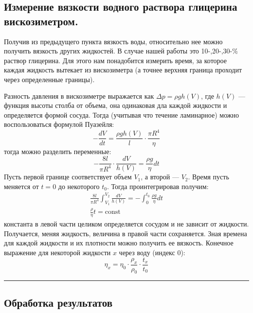 \documentclass[a4paper,12pt]{report}
\newcommand{\const}{\text{const}}
\begin{document}
    \begin{multicols}{2}
        \subsection*{Измерение вязкости водного раствора глицерина вискозиметром.}
        Получив из предыдущего пункта вязкость воды, относительно нее можно получить вязкость других жидкостей. В случае нашей работы это 10-,20-,30-\% раствор глицерина. Для этого нам понадобится измерить время, за которое каждая жидкость вытекает из вискозиметра (а точнее верхняя граница проходит через определенные границы).

        Разность давления в вискозиметре выражается как $\Delta p = \rho g h(V)$, где $h(V)$ --- функция высоты столба от объема, она одинаковая дла каждой жидкости и определяется формой сосуда. Тогда (учитывая что течение ламинарное) можно воспользоваться формулой Пуазейля:
        \begin{equation*}
            -\frac{dV}{dt}=\frac{\rho g h(V)}{l}\cdot\frac{\pi R^4}{\eta}
        \end{equation*}
        тогда можно разделить переменные:
        \begin{equation*}
            -\frac{8 l}{\pi R^4}\cdot \frac{dV}{h(V)}=\frac{\rho g}{\eta}dt
        \end{equation*}
        Пусть первой границе соответствует объем $V_1$, а второй --- $V_2$. Время пусть меняется от $t=0$ до некоторого $t_0$. Тогда проинтегрировав получим:
        \begin{gather}
            \frac{8l}{\pi R^4}\int_{V_1}^{V_2}\frac{dV}{h(V)}=-\int_{0}^{t_0}\frac{\rho g}{\eta}dt \nonumber \\
            \frac{\rho}{\eta}t = \const \label{connst}
        \end{gather}
        константа в левой части целиком определяется сосудом и не зависит от жидкости. Получается, меняя жидкость, величина в правой части сохраняется. Зная времена для каждой жидкости и их плотности можно получить ее вязкость. Конечное выражение для некоторой жидкости $x$ через воду (индекс 0):
        \begin{equation}
            \label{final eta}
            \eta_x=\eta_0\cdot\frac{\rho_x}{\rho_0}\cdot\frac{t_x}{t_0}
        \end{equation}
    \end{multicols}
    \vspace{2mm}
    \hrule
    \begin{multicols}{2}
        \section{Обработка результатов}
        
    \end{multicols}
\end{document}
